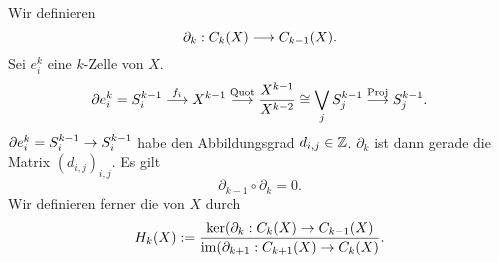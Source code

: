 Wir definieren 
\[ \partial_{k} : C_k(X) \overset{}{\longrightarrow} C_{k-1}(X).  \]
Sei $e^k_i$ eine $k$-Zelle von $X$.
\[ \partial e_i^k = S^{k-1}_i \overset{f_i}{\longrightarrow} X^{k-1} \overset{\mathrm{Quot}}{\longrightarrow} \frac{X^{k-1}}{X^{k-2}} \overset{}{\cong} \bigvee_j S_j^{k-1} \overset{\mathrm{Proj}}{\longrightarrow}S_j^{k-1}. \]
$\partial e_i^k = S^{k-1}_i \overset{}{\rightarrow} S^{k-1}_i$ habe den Abbildungsgrad $d_{i,j} \in \mathbb{Z}$. $\partial_k$ ist dann gerade die Matrix $(d_{i,j})_{i,j}$. Es gilt
\[ \partial_{k-1} \circ \partial_k = 0. \]
Wir definieren ferner die  von $X$ durch
\[ H_k(X) 
:=
\frac{ \ker (\partial_k : C_k(X) \overset{}{\rightarrow} C_{k-1}(X)}{ \mathrm{im}(\partial_{k+1} : C_{k+1}(X) \overset{}{\rightarrow} C_k(X) }.
\]